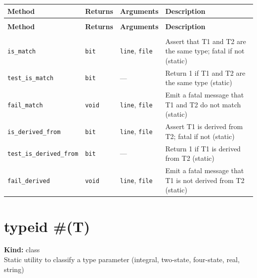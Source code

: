 \documentclass[11pt,letterpaper]{report}
\begin{document}
\begin{xltabular}{\linewidth}{>{\small}p{1.35in} >{\small}p{1.25in} >{\small}p{0.95in} >{\small}X}
\toprule
\textbf{Method} & \textbf{Returns} & \textbf{Arguments} & \textbf{Description} \\
\midrule
\endfirsthead
{} \\
\midrule
\textbf{Method} & \textbf{Returns} & \textbf{Arguments} & \textbf{Description} \\
\midrule
\endhead
\midrule
{} \\
\endfoot
\bottomrule
\endlastfoot
\texttt{is\_match} & \texttt{bit} & \texttt{line}, \texttt{file} & Assert that T1 and T2 are the same type; fatal if not (static) \\
\texttt{test\_is\_match} & \texttt{bit} & --- & Return 1 if T1 and T2 are the same type (static) \\
\texttt{fail\_match} & \texttt{void} & \texttt{line}, \texttt{file} & Emit a fatal message that T1 and T2 do not match (static) \\
\texttt{is\_derived\_from} & \texttt{bit} & \texttt{line}, \texttt{file} & Assert T1 is derived from T2; fatal if not (static) \\
\texttt{test\_is\_derived\_from} & \texttt{bit} & --- & Return 1 if T1 is derived from T2 (static) \\
\texttt{fail\_derived} & \texttt{void} & \texttt{line}, \texttt{file} & Emit a fatal message that T1 is not derived from T2 (static) \\
\end{xltabular}

\section{typeid \#(T)}
\label{cls:typeidT}

\noindent\textbf{Kind:} class\\
\noindent Static utility to classify a type parameter (integral, two-state, four-state, real, string)
\end{document}
